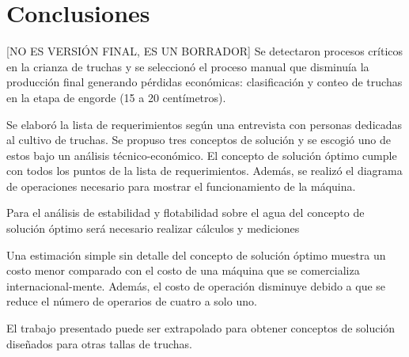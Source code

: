 
\pagestyle{myportland}
\doublespacing
\chapter*{\centering \large Conclusiones}
\thispagestyle{myportland}

[NO ES VERSIÓN FINAL, ES UN BORRADOR] Se detectaron procesos críticos en la crianza de truchas y se seleccionó el proceso manual que disminuía la producción final generando pérdidas económicas: clasificación y conteo de truchas en la etapa de engorde (15 a 20 centímetros).

Se elaboró la lista de requerimientos según una entrevista con personas dedicadas al cultivo de truchas. Se propuso tres conceptos de solución y se escogió uno de estos bajo un análisis técnico-económico. El concepto de solución óptimo cumple con todos los puntos de la lista de requerimientos. Además, se realizó el diagrama de operaciones necesario para mostrar el funcionamiento de la máquina.

Para el análisis de estabilidad y flotabilidad sobre el agua del concepto de solución óptimo será necesario realizar cálculos y mediciones 

Una estimación simple sin detalle del concepto de solución óptimo muestra un costo menor comparado con el costo de una máquina que se comercializa internacional-mente. Además, el costo de operación disminuye debido a que se reduce el número de operarios de cuatro a solo uno.

El trabajo presentado puede ser extrapolado para obtener conceptos de solución diseñados para otras tallas de truchas.